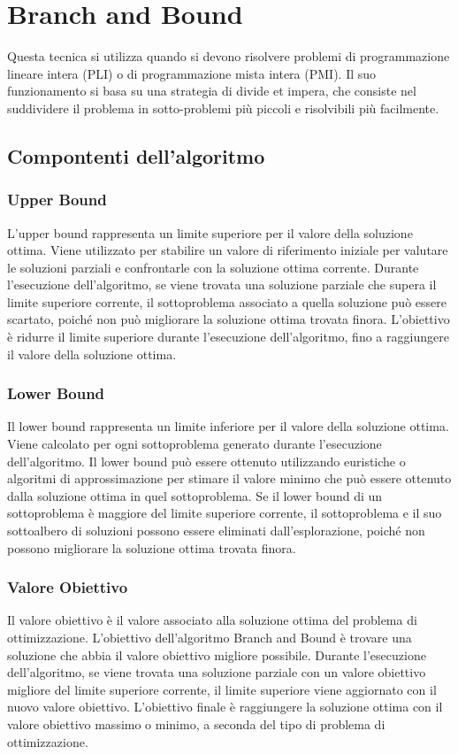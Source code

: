 \chapter{Branch and Bound}

Questa tecnica si utilizza quando si devono risolvere problemi di programmazione lineare intera (PLI) o di programmazione mista intera (PMI). Il suo funzionamento si basa su una strategia di divide et impera, che consiste nel suddividere il problema in sotto-problemi più piccoli e risolvibili più facilmente.

\section{Compontenti dell'algoritmo}

\subsection{Upper Bound}
L'upper bound rappresenta un limite superiore per il valore della soluzione ottima. Viene utilizzato per stabilire un valore di riferimento iniziale per valutare le soluzioni parziali e confrontarle con la soluzione ottima corrente. Durante l'esecuzione dell'algoritmo, se viene trovata una soluzione parziale che supera il limite superiore corrente, il sottoproblema associato a quella soluzione può essere scartato, poiché non può migliorare la soluzione ottima trovata finora. L'obiettivo è ridurre il limite superiore durante l'esecuzione dell'algoritmo, fino a raggiungere il valore della soluzione ottima.

\subsection{Lower Bound}
Il lower bound rappresenta un limite inferiore per il valore della soluzione ottima. Viene calcolato per ogni sottoproblema generato durante l'esecuzione dell'algoritmo. Il lower bound può essere ottenuto utilizzando euristiche o algoritmi di approssimazione per stimare il valore minimo che può essere ottenuto dalla soluzione ottima in quel sottoproblema. Se il lower bound di un sottoproblema è maggiore del limite superiore corrente, il sottoproblema e il suo sottoalbero di soluzioni possono essere eliminati dall'esplorazione, poiché non possono migliorare la soluzione ottima trovata finora.

\subsection{Valore Obiettivo}
Il valore obiettivo è il valore associato alla soluzione ottima del problema di ottimizzazione. L'obiettivo dell'algoritmo Branch and Bound è trovare una soluzione che abbia il valore obiettivo migliore possibile. Durante l'esecuzione dell'algoritmo, se viene trovata una soluzione parziale con un valore obiettivo migliore del limite superiore corrente, il limite superiore viene aggiornato con il nuovo valore obiettivo. L'obiettivo finale è raggiungere la soluzione ottima con il valore obiettivo massimo o minimo, a seconda del tipo di problema di ottimizzazione.

